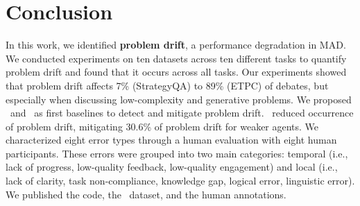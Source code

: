 \section{Conclusion}

In this work, we identified \textbf{problem drift}, a performance degradation in MAD.
We conducted experiments on ten datasets across ten different tasks to quantify problem drift and found that it occurs across all tasks.
Our experiments showed that problem drift affects 7\% (StrategyQA) to 89\% (ETPC) of debates, but especially when discussing low-complexity and generative problems.
We proposed \judge\ and \policy\ as first baselines to detect and mitigate problem drift.
\policy\ reduced occurrence of problem drift, mitigating 30.6\% of problem drift for weaker agents.
We characterized eight error types through a human evaluation with eight human participants.
These errors were grouped into two main categories: temporal (i.e., lack of progress, low-quality feedback, low-quality engagement) and local (i.e., lack of clarity, task non-compliance, knowledge gap, logical error, linguistic error).
We published the code, the \dataset\ dataset, and the human annotations.



